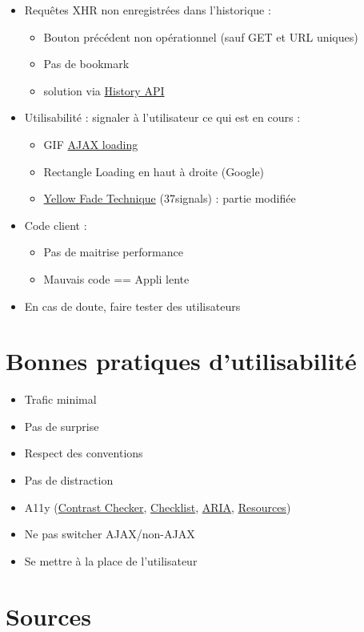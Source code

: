 \begin{itemize}
\tightlist
\item
  Requêtes XHR non enregistrées dans l'historique :

  \begin{itemize}
  \tightlist
  \item
    Bouton précédent non opérationnel (sauf GET et URL uniques)
  \item
    Pas de bookmark
  \item
    solution via
    \href{http://w3c.github.io/html/browsers.html\#session-history-and-navigation}{History
    API}
  \end{itemize}
\item
  Utilisabilité : signaler à l'utilisateur ce qui est en cours :

  \begin{itemize}
  \tightlist
  \item
    GIF \href{http://ajaxloadingimages.net/}{AJAX loading}
  \item
    Rectangle Loading en haut à droite (Google)
  \item
    \href{https://codepen.io/Mestika/pen/KVGwKb}{Yellow Fade Technique}
    (37signals) : partie modifiée
  \end{itemize}
\item
  Code client :

  \begin{itemize}
  \tightlist
  \item
    Pas de maitrise performance
  \item
    Mauvais code == Appli lente
  \end{itemize}
\item
  En cas de doute, faire tester des utilisateurs
\end{itemize}

\hypertarget{bonnes-pratiques-dutilisabilituxe9}{%
\section{Bonnes pratiques
d'utilisabilité}\label{bonnes-pratiques-dutilisabilituxe9}}

\begin{itemize}
\tightlist
\item
  Trafic minimal
\item
  Pas de surprise
\item
  Respect des conventions
\item
  Pas de distraction
\item
  A11y (\href{https://color.a11y.com/}{Contrast Checker},
  \href{https://www.a11yproject.com/checklist/}{Checklist},
  \href{https://developer.mozilla.org/en-US/docs/Web/Accessibility/ARIA}{ARIA},
  \href{https://www.a11yproject.com/resources/}{Resources})
\item
  Ne pas switcher AJAX/non-AJAX
\item
  Se mettre à la place de l'utilisateur
\end{itemize}

\hypertarget{sources}{%
\section{Sources}\label{sources}}
